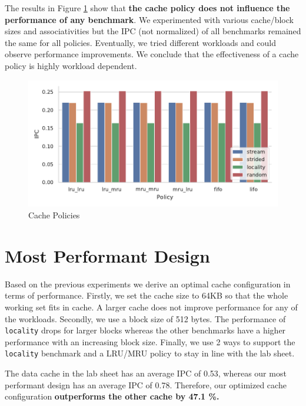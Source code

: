 \documentclass[a4paper]{article}
\begin{document}
The results in Figure \ref{fig:replacement} show that \textbf{the cache policy does not
influence the performance of any benchmark}. We experimented with various
cache/block sizes and associativities but the IPC (not normalized) of all
benchmarks remained the same for all policies. Eventually, we tried different
workloads and could observe performance improvements. We conclude that the
effectiveness of a cache policy is highly workload dependent.
\begin{figure}
    \centering
    \includegraphics[width=\textwidth]{replacement}
    \caption{Cache Policies}
    \label{fig:replacement}
\end{figure}

\section{Most Performant Design}

Based on the previous experiments we derive an optimal cache configuration in
terms of performance. Firstly, we set the cache size to 64KB so that the whole
working set fits in cache. A larger cache does not improve performance for any
of the workloads. Secondly, we use a block size of 512 bytes. The performance of
\texttt{locality} drops for larger blocks whereas the other benchmarks have
a higher performance with an increasing block size. Finally, we use 2 ways to
support the \texttt{locality} benchmark and a LRU/MRU policy to stay in line
with the lab sheet.

The data cache in the lab sheet has an average IPC of 0.53, whereas our most
performant design has an average IPC of 0.78. Therefore, our optimized cache
configuration \textbf{outperforms the other cache by 47.1 \%.}
\end{document}
